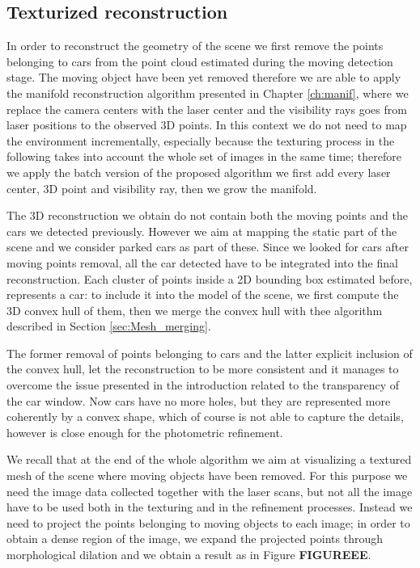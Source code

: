 \subsection{Texturized reconstruction}
In order to reconstruct the geometry of the scene we first remove the points belonging to cars from the point cloud estimated during the moving detection stage. The moving object have been yet removed therefore we are able to apply the manifold reconstruction algorithm presented in Chapter \ref{ch:manif}, where we replace the camera centers with the laser center and the visibility rays goes from laser positions to the observed 3D points.
In this context we do not  need to map the environment incrementally, especially because the texturing process in the following takes into account the whole set of images in the same time; therefore we apply the batch version of the proposed algorithm \ie we first add every laser center, 3D point and visibility ray, then we grow the manifold.

The 3D reconstruction we obtain do not contain both the moving points and the cars we detected previously. 
However we aim at mapping the static part of the scene and we consider parked cars as part of these. Since we looked for cars after moving points removal, all the car detected have to be integrated into the final reconstruction. 
Each cluster of points inside a 2D bounding box estimated before, represents a car: to include it into the model of the scene, we first compute the 3D convex hull of them, then we merge the convex hull with thee algorithm described in Section \ref{sec:Mesh_merging}.

The former removal of points belonging to cars and the latter explicit inclusion of the convex hull, let the reconstruction to be more consistent and it manages to overcome the issue presented in the introduction related to the transparency of the car window. Now cars have no more holes, but they are represented more coherently by a convex shape, which of course is not able to capture the details, however is close enough for the photometric refinement.
 
We recall that at the end of the whole algorithm we aim at visualizing a textured mesh of the scene where moving objects have been removed. 
For this purpose we need the image data collected together with the laser scans, but not all the image have to be used both in the texturing and in the refinement processes.
Instead we need to project the points belonging to moving objects to each image; in order to obtain a dense region of the image, we expand the projected points through morphological dilation and we obtain a result as in Figure \textbf{FIGUREEE}. 

